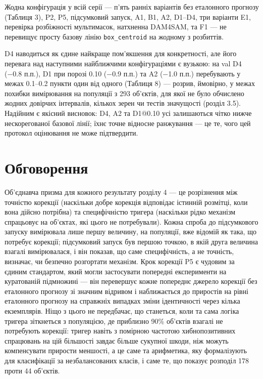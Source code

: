 \documentclass[11pt]{article}
\begin{document}
Жодна конфігурація у всій серії --- п'ять ранніх варіантів без еталонного прогнозу (Таблиця 3), P2, P5, підсумковий запуск, A1, B1, A2, D1--D4, три варіанти E1, перевірка розбіжності мультимасок, натхненна DAM4SAM, та F1 --- не перевищує просту базову лінію \texttt{box\_centroid} на жодному з розбиттів.

D4 наводиться як єдине найкраще пом'якшення для конкретності, але його перевага над наступними найближчими конфігураціями є вузькою: на val D4 (−0.8 п.п.), D1 при порозі 0.10 (−0.9 п.п.) та A2 (−1.0 п.п.) перебувають у межах 0.1--0.2 пункти один від одного (Таблиця 8) --- розрив, ймовірно, у межах похибки вимірювання на популяції з 293 об'єктів, для якої не було обчислено жодних довірчих інтервалів, кількох зерен чи тестів значущості (розділ 3.5). Надійним є якісний висновок: D4, A2 та D1@0.10 усі залишаються чітко нижче нескорегованої базової лінії; їхнє точне відносне ранжування --- це те, чого цей протокол оцінювання не може підтвердити.

\section{Обговорення}

Об'єднавча призма для кожного результату розділу 4 --- це розрізнення між точністю корекції (наскільки добре корекція відповідає істинній розмітці, коли вона дійсно потрібна) та специфічністю тригера (наскільки рідко механізм спрацьовує на об'єктах, які цього не потребували). Кожна спроба до підсумкового запуску вимірювала лише першу величину, на популяції, вже відомій як така, що потребує корекції; підсумковий запуск був першою точкою, в якій друга величина взагалі вимірювалася, і він показав, що саме специфічність, а не точність, визначає, чи безпечно розгортати механізм. Крок корекції P5 є чудовим за єдиним стандартом, який могли застосувати попередні експерименти на куратованій підмножині --- він перевершує кожне попереднє джерело корекції без еталонного прогнозу зі значним відривом і наближається до приростів на рівні еталонного прогнозу на справжніх випадках зміни ідентичності через кілька екземплярів. Ніщо з цього не передбачає, що станеться, коли та сама логіка тригера зіткнеться з популяцією, де приблизно 90\% об'єктів взагалі не потребують корекції: тригер навіть з помірною частотою хибнопозитивних спрацювань на цій більшості завдає більше сукупної шкоди, ніж можуть компенсувати прирости меншості, а це саме та арифметика, яку формалізують \citet{saito2015} для класифікації за незбалансованих класів, і саме те, що показує розподіл 178 проти 44 об'єктів.
\end{document}
